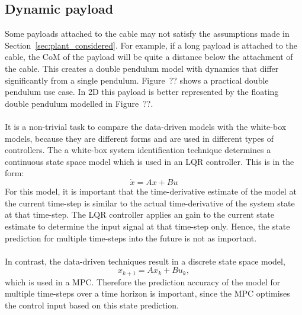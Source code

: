     \subsection{Dynamic payload} \label{sec:dynamic_payload}
        Some payloads attached to the cable may not satisfy the assumptions made in Section~\ref{sec:plant_considered}.
        For example, if a long payload is attached to the cable, the CoM of the payload will be quite a distance below the attachment of the cable.
        This creates a double pendulum model with dynamics that differ significantly from a single pendulum.
        Figure~?? shows a practical double pendulum use case. 
        In 2D this payload is better represented by the floating double pendulum modelled in Figure~??.

        
        \paragraph{}
        It is a non-trivial task to compare the data-driven models with the white-box models,
        because they are different forms and are used in different types of controllers.
        The a white-box system identification technique determines a continuous state space model 
        which is used in an LQR controller. 
        This is in the form:
        \begin{equation}
            \dot{x} = A x + B u
        \end{equation}
        For this model, it is important that the time-derivative estimate of the model 
        at the current time-step 
        is similar to the actual time-derivative of the system state at that time-step.
        The LQR controller applies an gain to the current state estimate 
        to determine the input signal at that time-step only.
        Hence, the state prediction for multiple time-steps into the future is not as important.

        \paragraph{}
        In contrast, the data-driven techniques result in a discrete state space model,
        \begin{equation}
            x_{k+1} = A x_k + B u_k ,
        \end{equation} 
        which is used in a MPC.
        Therefore the prediction accuracy of the model for multiple time-steps over a time horizon is important,
        since the MPC optimises the control input based on this state prediction.
        
